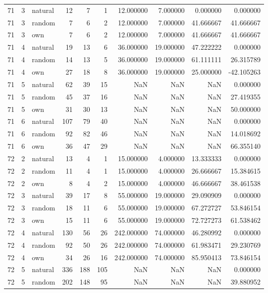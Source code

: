 \begin{table}[htbp]
\begin{tabular}{rrlrrrrrrr}
71 & 3 & natural & 12 & 7 & 1 & 12.000000 & 7.000000 & 0.000000 & 0.000000 \\
71 & 3 & random & 7 & 6 & 2 & 12.000000 & 7.000000 & 41.666667 & 41.666667 \\
71 & 3 & own & 7 & 6 & 2 & 12.000000 & 7.000000 & 41.666667 & 41.666667 \\
71 & 4 & natural & 19 & 13 & 6 & 36.000000 & 19.000000 & 47.222222 & 0.000000 \\
71 & 4 & random & 14 & 13 & 5 & 36.000000 & 19.000000 & 61.111111 & 26.315789 \\
71 & 4 & own & 27 & 18 & 8 & 36.000000 & 19.000000 & 25.000000 & -42.105263 \\
71 & 5 & natural & 62 & 39 & 15 & NaN & NaN & NaN & 0.000000 \\
71 & 5 & random & 45 & 37 & 16 & NaN & NaN & NaN & 27.419355 \\
71 & 5 & own & 31 & 30 & 13 & NaN & NaN & NaN & 50.000000 \\
71 & 6 & natural & 107 & 79 & 40 & NaN & NaN & NaN & 0.000000 \\
71 & 6 & random & 92 & 82 & 46 & NaN & NaN & NaN & 14.018692 \\
71 & 6 & own & 36 & 47 & 29 & NaN & NaN & NaN & 66.355140 \\
72 & 2 & natural & 13 & 4 & 1 & 15.000000 & 4.000000 & 13.333333 & 0.000000 \\
72 & 2 & random & 11 & 4 & 1 & 15.000000 & 4.000000 & 26.666667 & 15.384615 \\
72 & 2 & own & 8 & 4 & 2 & 15.000000 & 4.000000 & 46.666667 & 38.461538 \\
72 & 3 & natural & 39 & 17 & 8 & 55.000000 & 19.000000 & 29.090909 & 0.000000 \\
72 & 3 & random & 18 & 11 & 6 & 55.000000 & 19.000000 & 67.272727 & 53.846154 \\
72 & 3 & own & 15 & 11 & 6 & 55.000000 & 19.000000 & 72.727273 & 61.538462 \\
72 & 4 & natural & 130 & 56 & 26 & 242.000000 & 74.000000 & 46.280992 & 0.000000 \\
72 & 4 & random & 92 & 50 & 26 & 242.000000 & 74.000000 & 61.983471 & 29.230769 \\
72 & 4 & own & 34 & 26 & 16 & 242.000000 & 74.000000 & 85.950413 & 73.846154 \\
72 & 5 & natural & 336 & 188 & 105 & NaN & NaN & NaN & 0.000000 \\
72 & 5 & random & 202 & 148 & 95 & NaN & NaN & NaN & 39.880952 \\

\end{tabular}
\end{table}

